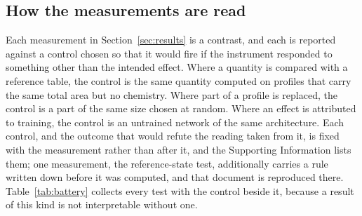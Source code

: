 \subsection{How the measurements are read}

Each measurement in Section~\ref{sec:results} is a contrast, and each is reported against a control
chosen so that it would fire if the instrument responded to something other than the intended
effect. Where a quantity is compared with a reference table, the control is the same quantity
computed on profiles that carry the same total area but no chemistry. Where part of a profile is
replaced, the control is a part of the same size chosen at random. Where an effect is attributed to
training, the control is an untrained network of the same architecture. Each control, and the outcome that would
refute the reading taken from it, is fixed with the measurement rather than after it, and the
Supporting Information lists them; one measurement, the reference-state test, additionally
carries a rule written down before it was computed, and that document is reproduced there. Table~\ref{tab:battery}
collects every test with the control beside it, because a result of this kind is not interpretable
without one.
